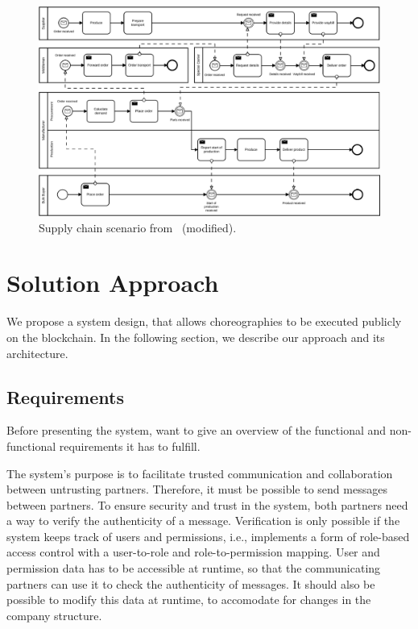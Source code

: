 \documentclass[runningheads]{llncs}
\begin{document}
\begin{figure}
	\centering
	\includegraphics[width=\textwidth]{fig/collaboration.eps}
	\caption{Supply chain scenario from~\cite{weber2016untrusted} (modified).}
	\label{fig:collaboration}
\end{figure}

\section{Solution Approach} \label{solutionapproach}
We propose a system design, that allows choreographies to be executed publicly on the blockchain.
In the following section, we describe our approach and its architecture.

\subsection{Requirements}

Before presenting the system, want to give an overview of the functional and non-functional requirements it has to fulfill.

The system's purpose is to facilitate trusted communication and collaboration between untrusting partners.
Therefore, it must be possible to send messages between partners.
To ensure security and trust in the system, both partners need a way to verify the authenticity of a message.
Verification is only possible if the system keeps track of users and permissions, i.e., implements a form of role-based access control with a user-to-role and role-to-permission mapping.
User and permission data has to be accessible at runtime, so that the communicating partners can use it to check the authenticity of messages.
It should also be possible to modify this data at runtime, to accomodate for changes in the company structure.
\end{document}

